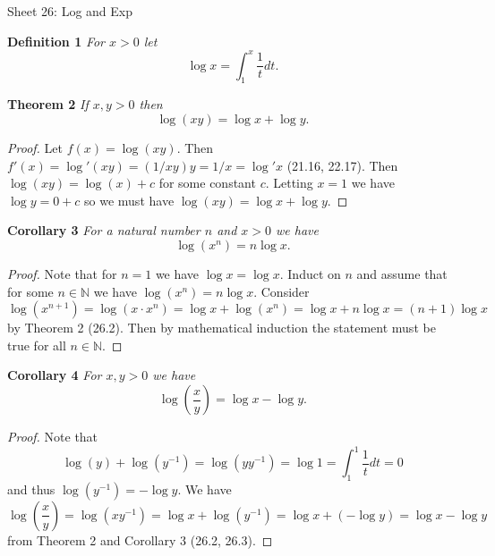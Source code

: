\documentclass{article}
\begin{document}
\begin{flushleft}

\Large

Sheet 26: Log and Exp\newline

\normalsize

\textbf{Definition 1}
\textsl{For $x > 0$ let
\[
\log x = \int_1^x \frac{1}{t}dt.
\]}

\textbf{Theorem 2}
\textsl{If $x,y > 0$ then
\[
\log (xy) = \log x + \log y.
\]}
\begin{proof}
Let $f(x) = \log(xy)$. Then $f'(x) = \log' (xy) = (1/xy)y = 1/x = \log' x$ (21.16, 22.17). Then $\log (xy) = \log (x) + c$ for some constant $c$. Letting $x = 1$ we have $\log y = 0 + c$ so we must have $\log (xy) = \log x + \log y$.
\end{proof}

\textbf{Corollary 3}
\textsl{For a natural number $n$ and $x > 0$ we have
\[
\log (x^n) = n \log x.
\]}
\begin{proof}
Note that for $n=1$ we have $\log x = \log x$. Induct on $n$ and assume that for some $n \in \mathbb{N}$ we have $\log (x^n) = n \log x$. Consider
\[
\log (x^{n+1}) = \log(x \cdot x^n) = \log x + \log (x^n) = \log x + n \log x = (n+1) \log x
\]
by Theorem 2 (26.2). Then by mathematical induction the statement must be true for all $n \in \mathbb{N}$.
\end{proof}

\textbf{Corollary 4}
\textsl{For $x,y > 0$ we have
\[
\log \left ( \frac{x}{y} \right ) = \log x - \log y.
\]}
\begin{proof}
Note that
\[
\log (y) + \log \left ( y^{-1} \right ) = \log (yy^{-1}) = \log 1 = \int_1^1 \frac{1}{t} dt = 0
\]
and thus $\log (y^{-1}) = -\log y$. We have
\[
\log \left ( \frac{x}{y} \right ) = \log \left ( x y^{-1} \right ) = \log x + \log \left ( y^{-1} \right ) = \log x + (- \log y) = \log x - \log y
\]
from Theorem 2 and Corollary 3 (26.2, 26.3).
\end{proof}


\end{flushleft}
\end{document}
